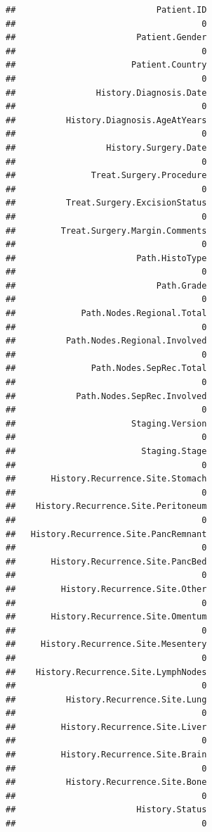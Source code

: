 \documentclass{article}
\begin{document}
\begin{knitrout}
\begin{kframe}
\begin{alltt}
\end{alltt}
\begin{verbatim}
##                            Patient.ID 
##                                     0 
##                        Patient.Gender 
##                                     0 
##                       Patient.Country 
##                                     0 
##                History.Diagnosis.Date 
##                                     0 
##          History.Diagnosis.AgeAtYears 
##                                     0 
##                  History.Surgery.Date 
##                                     0 
##               Treat.Surgery.Procedure 
##                                     0 
##          Treat.Surgery.ExcisionStatus 
##                                     0 
##         Treat.Surgery.Margin.Comments 
##                                     0 
##                        Path.HistoType 
##                                     0 
##                            Path.Grade 
##                                     0 
##             Path.Nodes.Regional.Total 
##                                     0 
##          Path.Nodes.Regional.Involved 
##                                     0 
##               Path.Nodes.SepRec.Total 
##                                     0 
##            Path.Nodes.SepRec.Involved 
##                                     0 
##                       Staging.Version 
##                                     0 
##                         Staging.Stage 
##                                     0 
##       History.Recurrence.Site.Stomach 
##                                     0 
##    History.Recurrence.Site.Peritoneum 
##                                     0 
##   History.Recurrence.Site.PancRemnant 
##                                     0 
##       History.Recurrence.Site.PancBed 
##                                     0 
##         History.Recurrence.Site.Other 
##                                     0 
##       History.Recurrence.Site.Omentum 
##                                     0 
##     History.Recurrence.Site.Mesentery 
##                                     0 
##    History.Recurrence.Site.LymphNodes 
##                                     0 
##          History.Recurrence.Site.Lung 
##                                     0 
##         History.Recurrence.Site.Liver 
##                                     0 
##         History.Recurrence.Site.Brain 
##                                     0 
##          History.Recurrence.Site.Bone 
##                                     0 
##                        History.Status 
##                                     0 

\end{verbatim}
\end{kframe}
\end{knitrout}
\end{document}
